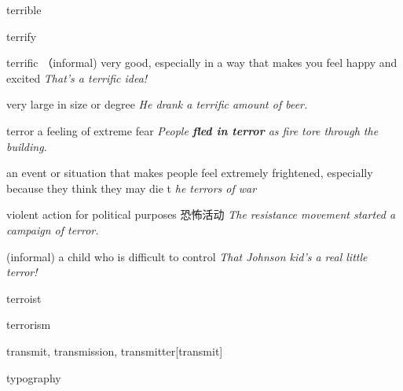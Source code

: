 \begin{DefWord}{terrible}
\end{DefWord}

\begin{DefWord}{terrify}
\end{DefWord}

\begin{DefWord}{terrific}
    （informal) very good, especially in a way that makes you feel happy and excited
    \textit{That's a terrific idea!}

    very large in size or degree
    \textit{He drank a terrific amount of beer.}
\end{DefWord}

\begin{DefWord}{terror}
    a feeling of extreme fear
    \textit{People \textbf{fled in terror} as fire tore through the building.}

    an event or situation that makes people feel extremely frightened, especially because they think they may die
    t 
    \textit{he terrors of war}

    violent action for political purposes 恐怖活动
    \textit{The resistance movement started a campaign of terror.}

    (informal) a child who is difficult to control
    \textit{That Johnson kid's a real little terror!}

\end{DefWord}

\begin{DefWord}{terroist}
\end{DefWord}

\begin{DefWord}{terrorism}
\end{DefWord}

\begin{DefWord}{transmit, transmission, transmitter}[transmit]
\end{DefWord}

\begin{DefWord}{typography}
\end{DefWord}